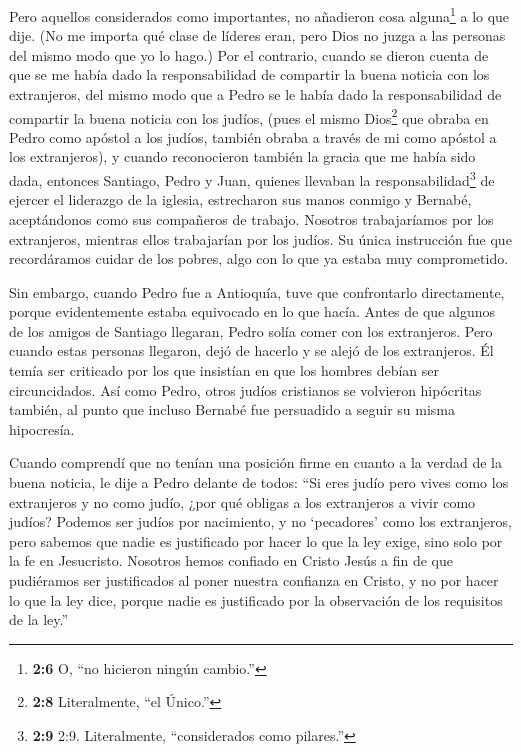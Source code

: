  Pero aquellos considerados como importantes, no añadieron
cosa alguna\footnote{\textbf{2:6} O, ``no hicieron ningún cambio.''} a
lo que dije. (No me importa qué clase de líderes eran, pero Dios no
juzga a las personas del mismo modo que yo lo hago.)  Por el
contrario, cuando se dieron cuenta de que se me había dado la
responsabilidad de compartir la buena noticia con los extranjeros, del
mismo modo que a Pedro se le había dado la responsabilidad de compartir
la buena noticia con los judíos,  (pues el mismo
Dios\footnote{\textbf{2:8} Literalmente, ``el Único.''} que obraba en
Pedro como apóstol a los judíos, también obraba a través de mi como
apóstol a los extranjeros),  y cuando reconocieron también
la gracia que me había sido dada, entonces Santiago, Pedro y Juan,
quienes llevaban la responsabilidad\footnote{\textbf{2:9} 2:9.
  Literalmente, ``considerados como pilares.''} de ejercer el liderazgo
de la iglesia, estrecharon sus manos conmigo y Bernabé, aceptándonos
como sus compañeros de trabajo.  Nosotros trabajaríamos por
los extranjeros, mientras ellos trabajarían por los judíos. Su única
instrucción fue que recordáramos cuidar de los pobres, algo con lo que
ya estaba muy comprometido.

 Sin embargo, cuando Pedro fue a Antioquía, tuve que
confrontarlo directamente, porque evidentemente estaba equivocado en lo
que hacía.  Antes de que algunos de los amigos de Santiago
llegaran, Pedro solía comer con los extranjeros. Pero cuando estas
personas llegaron, dejó de hacerlo y se alejó de los extranjeros. Él
temía ser criticado por los que insistían en que los hombres debían ser
circuncidados.  Así como Pedro, otros judíos cristianos se
volvieron hipócritas también, al punto que incluso Bernabé fue
persuadido a seguir su misma hipocresía.

 Cuando comprendí que no tenían una posición firme en
cuanto a la verdad de la buena noticia, le dije a Pedro delante de
todos: ``Si eres judío pero vives como los extranjeros y no como judío,
¿por qué obligas a los extranjeros a vivir como judíos? 
Podemos ser judíos por nacimiento, y no `pecadores' como los
extranjeros,  pero sabemos que nadie es justificado por
hacer lo que la ley exige, sino solo por la fe en Jesucristo. Nosotros
hemos confiado en Cristo Jesús a fin de que pudiéramos ser justificados
al poner nuestra confianza en Cristo, y no por hacer lo que la ley dice,
porque nadie es justificado por la observación de los requisitos de la
ley.''

